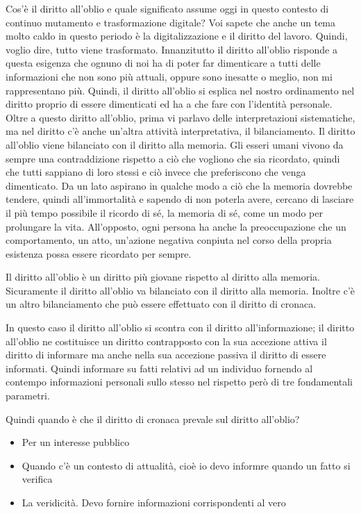 Cos'è il diritto all'oblio e quale significato assume oggi in questo contesto di continuo mutamento e trasformazione digitale?
Voi sapete che anche un tema molto caldo in questo periodo è la digitalizzazione e il diritto del lavoro.
Quindi, voglio dire, tutto viene trasformato.
Innanzitutto il diritto all'oblio risponde a questa esigenza che ognuno di noi ha di poter far dimenticare a tutti delle informazioni che non sono più attuali, oppure sono inesatte o meglio, non mi rappresentano più.
Quindi, il diritto all'oblio si esplica nel nostro ordinamento nel diritto proprio di essere dimenticati ed ha a che fare con l'identità personale.
Oltre a questo diritto all'oblio, prima vi parlavo delle interpretazioni sistematiche, ma nel diritto c'è anche un'altra attività interpretativa, il bilanciamento.
Il diritto all'oblio viene bilanciato con il diritto alla memoria.
Gli esseri umani vivono da sempre una contraddizione rispetto a ciò che vogliono che sia ricordato, quindi che tutti sappiano di loro stessi e ciò invece che preferiscono che venga dimenticato.
Da un lato aspirano in qualche modo a ciò che la memoria dovrebbe tendere, quindi all'immortalità e sapendo di non poterla avere, cercano di lasciare il più tempo possibile il ricordo di sé, la memoria di sé, come un modo per prolungare la vita.
All'opposto, ogni persona ha anche la preoccupazione che un comportamento, un atto, un'azione negativa conpiuta nel corso della propria esistenza possa essere ricordato per sempre.

Il diritto all'oblio è un diritto più giovane rispetto al diritto alla memoria. Sicuramente il diritto all'oblio va bilanciato con il diritto alla memoria. Inoltre c'è un altro bilanciamento che può essere effettuato con il diritto di cronaca.

In questo caso il diritto all'oblio si scontra con il diritto all'informazione; il diritto all'oblio ne costituisce un diritto contrapposto con la sua accezione attiva il diritto di informare ma anche nella sua accezione passiva il diritto di essere informati.
Quindi informare su fatti relativi ad un individuo fornendo al contempo informazioni personali sullo stesso nel rispetto però di tre fondamentali parametri.

Quindi quando è che il diritto di cronaca prevale sul diritto all'oblio?

\begin{itemize}
    \item Per un interesse pubblico
    \item Quando c'è un contesto di attualità, cioè io devo informre quando un fatto si verifica
    \item La veridicità. Devo fornire informazioni corrispondenti al vero
\end{itemize}


